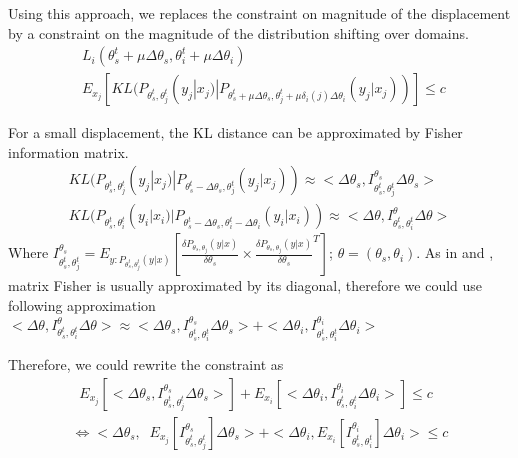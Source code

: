 \documentclass[12pt,times,a4paper,twoside]{article}
\theoremstyle{definition}
\DeclareMathOperator*{\argmax}{argmax}
\begin{document}
Using this approach, we replaces the constraint on magnitude of the displacement by a constraint on the magnitude of the distribution shifting over domains.
\begin{align}
	\displaystyle{\mathop{\argmax_{\Delta \theta}} L_i(\theta_s^t + \mu \Delta \theta_s, \theta_i^t + \mu \Delta \theta_i)} \\
	\mathop{\sum_{j=1}^{T}} E_{x_j}[KL(P_{\theta^t_s, \theta^t_j}(y_j|x_j)|P_{\theta^t_s + \mu \Delta \theta_s, \theta^t_j + \mu \delta_{i}(j) \Delta \theta_i}(y_j|x_j))] \leq c \nonumber
\end{align}

For a small displacement, the KL distance can be approximated by Fisher information matrix.
\begin{align}
KL(P_{\theta^t_s, \theta^t_j}(y_j|x_j)|P_{\theta^t_s - \Delta \theta_s, \theta^t_j}(y_j|x_j)) \approx <\Delta \theta_s , I_{\theta^t_s, \theta^t_j}^{\theta_s} \Delta \theta_s > \\
KL(P_{\theta^t_s, \theta^t_i}(y_i|x_i)|P_{\theta^t_s - \Delta \theta_s, \theta^t_i - \Delta \theta_i}(y_i|x_i)) \approx <\Delta \theta , I_{\theta^t_s, \theta^t_i}^{\theta} \Delta \theta >
\end{align}
Where $I_{\theta^t_s, \theta^t_j}^{\theta_s} = E_{y:P_{\theta^t_s, \theta^t_j}(y|x)}[\frac{\delta P_{\theta_s, \theta_j}(y|x)}{\delta \theta_s} \times \frac{\delta P_{\theta_s, \theta_j}(y|x)}{\delta \theta_s}^T]$; $\theta = (\theta_s, \theta_i)$. As in \citet{Thompson19overcoming} and \citet{Kirkpatrick17overcoming}, matrix Fisher is usually approximated by its diagonal, therefore we could use following approximation $<\Delta \theta , I_{\theta^t_s, \theta^t_i}^{\theta} \Delta \theta > \approx <\Delta \theta_s , I_{\theta^t_s, \theta^t_i}^{\theta_s} \Delta \theta_s > + <\Delta \theta_i , I_{\theta^t_s, \theta^t_i}^{\theta_i} \Delta \theta_i >$

Therefore, we could rewrite the constraint as
\begin{align}
\mathop{\sum_{j=1}^{T}}  E_{x_j}[<\Delta \theta_s , I_{\theta^t_s, \theta^t_j}^{\theta_s} \Delta \theta_s >] + E_{x_i}[<\Delta \theta_i , I_{\theta^t_s, \theta^t_i}^{\theta_i} \Delta \theta_i >] \leq  c \\
\Longleftrightarrow <\Delta \theta_s , \mathop{\sum_{j=1}^{T}}  E_{x_j}[I_{\theta^t_s, \theta^t_j}^{\theta_s}] \Delta \theta_s > + <\Delta \theta_i , E_{x_i}[I_{\theta^t_s, \theta^t_i}^{\theta_i}] \Delta \theta_i > \leq c 
\end{align} 
\end{document}

